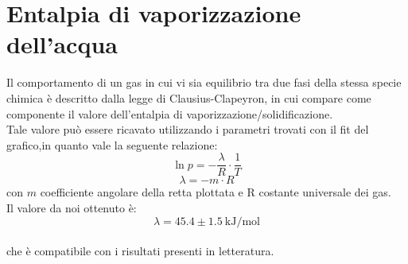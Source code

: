 \documentclass[11pt]{article}
\begin{document}
\section{Entalpia di vaporizzazione dell'acqua}
Il comportamento di un gas in cui vi sia equilibrio tra due fasi della stessa specie chimica è descritto dalla legge di Clausius-Clapeyron, in cui compare come componente il valore dell'entalpia di vaporizzazione/solidificazione. 
\\
Tale valore può essere ricavato utilizzando i parametri trovati con il fit del grafico,in quanto vale la seguente relazione:
$$\ln{p}= -\frac{\lambda}{R}\cdot\frac{1}{T}$$
$$\lambda =-m \cdot R$$
con $m$ coefficiente angolare della retta plottata e R costante universale dei gas. \\
Il valore da noi ottenuto è:
$$\lambda = 45.4 \pm 1.5 ~\text{kJ}/\text{mol}$$   
\\che è compatibile con i risultati presenti in letteratura. 
\end{document}
